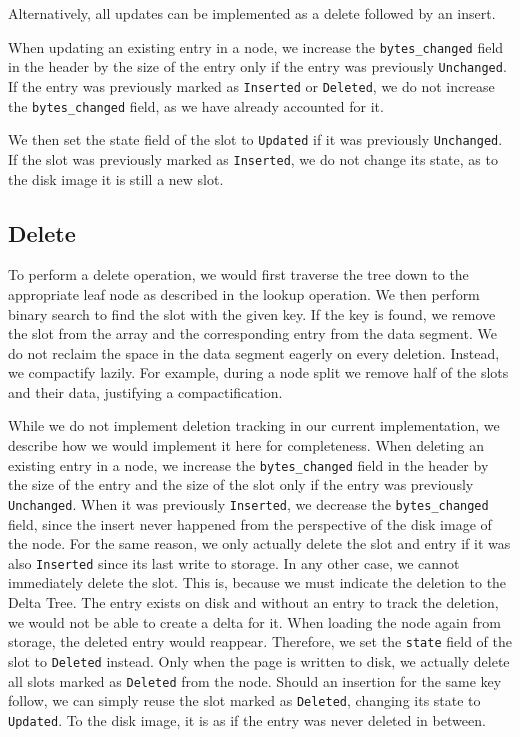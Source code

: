 Alternatively, all updates can be implemented as a delete followed by an insert.

When updating an existing entry in a node, we increase the \texttt{bytes\_changed} field in the header by the size of the entry only if the entry was previously \texttt{Unchanged}.
If the entry was previously marked as \texttt{Inserted} or \texttt{Deleted}, we do not increase the \texttt{bytes\_changed} field, as we have already accounted for it.

We then set the state field of the slot to \texttt{Updated} if it was previously \texttt{Unchanged}.
If the slot was previously marked as \texttt{Inserted}, we do not change its state, as to the disk image it is still a new slot.

\subsection*{Delete}
\label{subsec:delete}
To perform a delete operation, we would first traverse the tree down to the appropriate leaf node as described in the lookup operation.
We then perform binary search to find the slot with the given key.
If the key is found, we remove the slot from the array and the corresponding entry from the data segment.
We do not reclaim the space in the data segment eagerly on every deletion.
Instead, we compactify lazily. 
For example, during a node split we remove half of the slots and their data, justifying a compactification.

While we do not implement deletion tracking in our current implementation, we describe how we would implement it here for completeness.
When deleting an existing entry in a node, we increase the \texttt{bytes\_changed} field in the header by the size of the entry and the size of the slot only if the entry was previously \texttt{Unchanged}.
When it was previously \texttt{Inserted}, we decrease the \texttt{bytes\_changed} field, since the insert never happened from the perspective of the disk image of the node.
For the same reason, we only actually delete the slot and entry if it was also \texttt{Inserted} since its last write to storage.
In any other case, we cannot immediately delete the slot.
This is, because we must indicate the deletion to the Delta Tree.
The entry exists on disk and without an entry to track the deletion, we would not be able to create a delta for it.
When loading the node again from storage, the deleted entry would reappear.
Therefore, we set the \texttt{state} field of the slot to \texttt{Deleted} instead.
Only when the page is written to disk, we actually delete all slots marked as \texttt{Deleted} from the node.
Should an insertion for the same key follow, we can simply reuse the slot marked as \texttt{Deleted}, changing its state to \texttt{Updated}.
To the disk image, it is as if the entry was never deleted in between.

